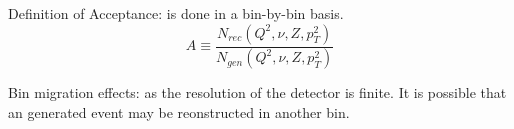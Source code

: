 Definition of Acceptance: is done in a bin-by-bin basis. 
\begin{equation}
  A \equiv \frac{N_{rec}(Q^2, \nu, Z, p_T^2)}{N_{gen}(Q^2, \nu, Z, p_T^2)}
\end{equation}

Bin migration effects: as the resolution of the detector is finite. It is possible that an generated event may be reonstructed in another bin.

